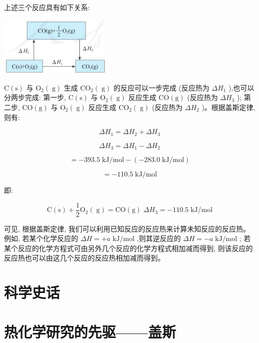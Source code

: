 \documentclass[10pt]{article}
\begin{document}
上述三个反应具有如下关系:

\begin{center}
\includegraphics[max width=0.4\textwidth]{images/0190da9d-8bfd-732f-bc2c-0b21d0f13b91_20_311662.jpg}
\end{center}

\(\mathrm{C}\left( \mathrm{s}\right)\) 与 \({\mathrm{O}}_{2}\left( \mathrm{\;g}\right)\) 生成 \({\mathrm{{CO}}}_{2}\left( \mathrm{\;g}\right)\) 的反应可以一步完成 (反应热为 \(\Delta {H}_{1}\) ),也可以分两步完成: 第一步, \(\mathrm{C}\left( \mathrm{s}\right)\) 与 \({\mathrm{O}}_{2}\left( \mathrm{\;g}\right)\) 反应生成 \(\mathrm{{CO}}\left( \mathrm{g}\right)\) (反应热为 \(\Delta {H}_{3}\) ); 第二步, \(\mathrm{{CO}}\left( \mathrm{g}\right)\) 与 \({\mathrm{O}}_{2}\left( \mathrm{\;g}\right)\) 反应生成 \({\mathrm{{CO}}}_{2}\left( \mathrm{\;g}\right)\) (反应热为 \(\Delta {H}_{2}\) )。根据盖斯定律,则有:

\[
\Delta {H}_{1} = \Delta {H}_{2} + \Delta {H}_{3}
\]

\[
\Delta {H}_{3} = \Delta {H}_{1} - \Delta {H}_{2}
\]

\[
= - {393.5}\mathrm{\;{kJ}}/\mathrm{{mol}} - \left( {-{283.0}\mathrm{\;{kJ}}/\mathrm{{mol}}}\right)
\]

\[
= - {110.5}\mathrm{\;{kJ}}/\mathrm{{mol}}
\]

即:

\[
\mathrm{C}\left( \mathrm{s}\right) + \frac{1}{2}{\mathrm{O}}_{2}\left( \mathrm{\;g}\right) = \mathrm{{CO}}\left( \mathrm{g}\right) \;\Delta {H}_{3} = - {110.5}\mathrm{\;{kJ}}/\mathrm{{mol}}
\]

可见, 根据盖斯定律, 我们可以利用已知反应的反应热来计算未知反应的反应热。例如, 若某个化学反应的 \({\Delta H} = + a\mathrm{\;{kJ}}/\mathrm{{mol}}\) ,则其逆反应的 \({\Delta H} = - a\mathrm{\;{kJ}}/\mathrm{{mol}}\) ; 若某个反应的化学方程式可由另外几个反应的化学方程式相加减而得到, 则该反应的反应热也可以由这几个反应的反应热相加减而得到。

\section*{科学史话}

\section*{热化学研究的先驱——盖斯}
\end{document}
